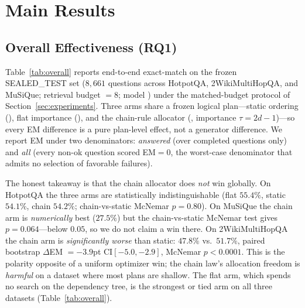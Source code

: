\section{Main Results}
\label{sec:results}

\subsection{Overall Effectiveness (RQ1)}
Table~\ref{tab:overall} reports end-to-end exact-match on the frozen
SEALED\_TEST set ($8{,}661$ questions across HotpotQA, 2WikiMultiHopQA, and
MuSiQue; retrieval budget $=8$; model ) under the
matched-budget protocol of Section~\ref{sec:experiments}. Three arms share a
frozen logical plan---static ordering (), flat
importance (), and the chain-rule allocator
(, importance $\tau = 2d - 1$)---so every EM difference
is a pure plan-level effect, not a generator difference. We report EM under two
denominators: \emph{answered} (over completed questions only) and \emph{all}
(every non-ok question scored EM$=0$, the worst-case denominator that admits no
selection of favorable failures).

The honest takeaway is that the chain allocator does \emph{not} win globally.
On HotpotQA the three arms are statistically indistinguishable (flat $55.4\%$,
static $54.1\%$, chain $54.2\%$; chain-vs-static McNemar $p{=}0.80$). On
MuSiQue the chain arm is \emph{numerically} best ($27.5\%$) but the
chain-vs-static McNemar test gives $p{=}0.064$---below $0.05$, so we do not
claim a win there. On 2WikiMultiHopQA the chain arm is \emph{significantly
worse} than static: $47.8\%$ vs.\ $51.7\%$, paired bootstrap
$\Delta$EM $=-3.9$pt CI$[-5.0,-2.9]$, McNemar $p<0.0001$. This is the polarity
opposite of a uniform optimizer win; the chain law's allocation freedom is
\emph{harmful} on a dataset where most plans are shallow. The flat arm, which
spends no search on the dependency tree, is the strongest or tied arm on all
three datasets (Table~\ref{tab:overall}).

